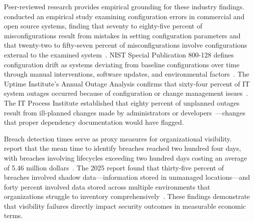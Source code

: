 Peer-reviewed research provides empirical grounding for these industry findings. \citeauthor{Yin_Yuan_Lu_2011} conducted an empirical study examining configuration errors in commercial and open source systems, finding that seventy to eighty-five percent of misconfigurations result from mistakes in setting configuration parameters and that twenty-two to fifty-seven percent of misconfigurations involve configurations external to the examined system~\parencite{Yin_Yuan_Lu_2011}. NIST Special Publication 800-128 defines configuration drift as systems deviating from baseline configurations over time through manual interventions, software updates, and environmental factors~\parencite{NIST_SP_800_128}. The Uptime Institute's Annual Outage Analysis confirms that sixty-four percent of IT system outages occurred because of configuration or change management issues~\parencite{Uptime_Outage_2023}. The IT Process Institute established that eighty percent of unplanned outages result from ill-planned changes made by administrators or developers~\parencite{IT_Process_Institute_2004}---changes that proper dependency documentation would have flagged.

Breach detection times serve as proxy measures for organizational visibility. \citeauthor{IBM_Ponemon_2024} report that the mean time to identify breaches reached two hundred four days, with breaches involving lifecycles exceeding two hundred days costing an average of 5.46 million dollars~\parencite{IBM_Ponemon_2024}. The 2025 report found that thirty-five percent of breaches involved shadow data---information stored in unmanaged locations---and forty percent involved data stored across multiple environments that organizations struggle to inventory comprehensively~\parencite{IBM_Ponemon_2025}. These findings demonstrate that visibility failures directly impact security outcomes in measurable economic terms.


